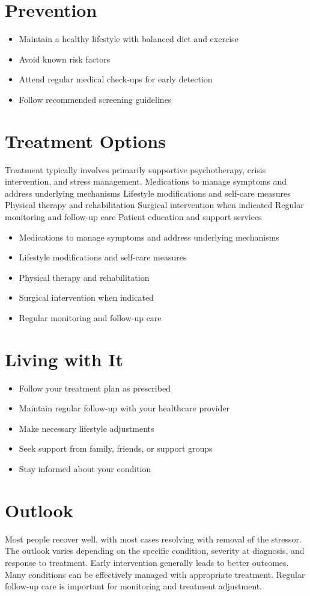 \section{Prevention}
\begin{itemize}[noitemsep]
  \item Maintain a healthy lifestyle with balanced diet and exercise
  \item Avoid known risk factors
  \item Attend regular medical check-ups for early detection
  \item Follow recommended screening guidelines
\end{itemize}
\section{Treatment Options}
Treatment typically involves primarily supportive psychotherapy, crisis intervention, and stress management. Medications to manage symptoms and address underlying mechanisms Lifestyle modifications and self-care measures Physical therapy and rehabilitation Surgical intervention when indicated Regular monitoring and follow-up care Patient education and support services

\begin{itemize}[noitemsep]
  \item Medications to manage symptoms and address underlying mechanisms
  \item Lifestyle modifications and self-care measures
  \item Physical therapy and rehabilitation
  \item Surgical intervention when indicated
  \item Regular monitoring and follow-up care
\end{itemize}
\section{Living with It}
\begin{itemize}[noitemsep]
  \item Follow your treatment plan as prescribed
  \item Maintain regular follow-up with your healthcare provider
  \item Make necessary lifestyle adjustments
  \item Seek support from family, friends, or support groups
  \item Stay informed about your condition
\end{itemize}
\section{Outlook}
Most people recover well, with most cases resolving with removal of the stressor. The outlook varies depending on the specific condition, severity at diagnosis, and response to treatment. Early intervention generally leads to better outcomes. Many conditions can be effectively managed with appropriate treatment. Regular follow-up care is important for monitoring and treatment adjustment.
